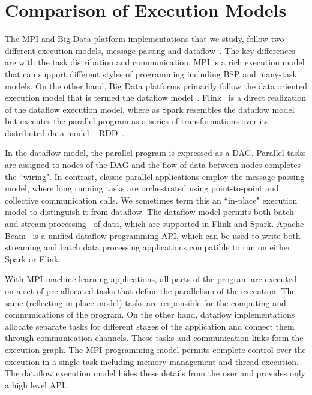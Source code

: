 \documentclass[10pt, conference, compsocconf]{IEEEtran}
\begin{document}
\section{Comparison of Execution Models} \label{sec:exec_models}The \ac{MPI} and Big Data platform implementations that we study, follow two different execution models, message passing and dataflow~\cite{akidau2015dataflow}. The key differences are with the task distribution and communication. \ac{MPI} is a rich execution model that can support different styles of programming including \ac{BSP} and many-task models. On the other hand, Big Data platforms primarily follow the data oriented execution model that is termed the dataflow model~\cite{akidau2015dataflow}. Flink~\cite{apache_flink} is a direct realization of the dataflow execution model, where as Spark resembles the dataflow model but executes the parallel program as a series of transformations over its distributed data model -- \ac{RDD}~\cite{zaharia2012resilient}.

In the dataflow model, the parallel program is expressed as a \ac{DAG}. Parallel tasks are assigned to nodes of the \ac{DAG} and the flow of data between nodes completes the ``wiring". In contrast, classic parallel applications employ the message passing model, where long running tasks are orchestrated using point-to-point and collective communication calls. We sometimes term this an ``in-place" execution model to distinguish it from dataflow. The dataflow model permits both batch and stream processing~\cite{zaharia2012discretized} of data, which are supported in Flink and Spark. Apache Beam~\cite{apache_beam} is a unified  dataflow programming \ac{API}, which can be used to write both streaming and batch data processing applications compatible to run on either Spark or Flink. 

With \ac{MPI} machine learning applications, all parts of the program are executed on a set of pre-allocated tasks that define the parallelism of the execution. The same (reflecting in-place model) tasks are responsible for the computing and communications of the program. On the other hand, dataflow implementations allocate separate tasks for different stages of the application and connect them through communication channels. These tasks and communication links form the execution graph. The \ac{MPI}  programming model permits complete control over the execution in a single task including memory management and thread execution. The  dataflow execution model hides these details from the user and provides only a high level \ac{API}. 
\end{document}
